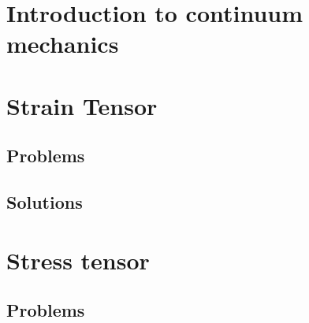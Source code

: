 %
%
%
\chapter{Introduction to continuum mechanics}
   

%

\chapter{Strain Tensor}
   
   
   
   
   
   
   \section{Problems}
      
   \section{Solutions}
      \shipoutAnswer

\chapter{Stress tensor}
   
   
   
   
   
   
   
   
   \section{Problems}
      
